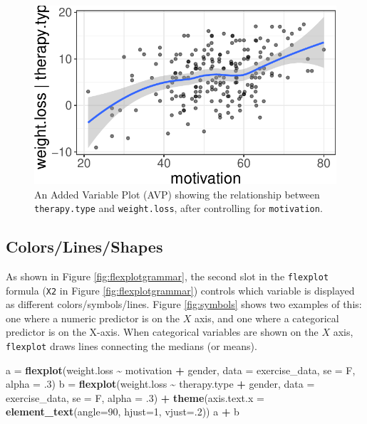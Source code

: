 \documentclass[
  man]{apa6}
\newenvironment{Shaded}{\begin{snugshade}}{\end{snugshade}}
\newcommand{\DataTypeTok}[1]{\textcolor[rgb]{0.13,0.29,0.53}{#1}}
\newcommand{\DecValTok}[1]{\textcolor[rgb]{0.00,0.00,0.81}{#1}}
\newcommand{\FloatTok}[1]{\textcolor[rgb]{0.00,0.00,0.81}{#1}}
\newcommand{\KeywordTok}[1]{\textcolor[rgb]{0.13,0.29,0.53}{\textbf{#1}}}
\newcommand{\NormalTok}[1]{#1}
\newcommand{\OperatorTok}[1]{\textcolor[rgb]{0.81,0.36,0.00}{\textbf{#1}}}
\newcommand{\StringTok}[1]{\textcolor[rgb]{0.31,0.60,0.02}{#1}}
\begin{document}
\begin{figure}
\centering
\includegraphics{flexplot_psychmeth_files/figure-latex/avp-3.pdf}
\caption{\label{fig:avp-3}An Added Variable Plot (AVP) showing the relationship between \texttt{therapy.type} and \texttt{weight.loss}, after controlling for \texttt{motivation}. \label{fig:avp}}
\end{figure}

\normalsize

\hypertarget{colorslinesshapes}{%
\subsection{Colors/Lines/Shapes}\label{colorslinesshapes}}

As shown in Figure \ref{fig:flexplotgrammar}, the second slot in the \texttt{flexplot} formula (\texttt{X2} in Figure \ref{fig:flexplotgrammar}) controls which variable is displayed as different colors/symbols/lines. Figure \ref{fig:symbols} shows two examples of this: one where a numeric predictor is on the \(X\) axis, and one where a categorical predictor is on the X-axis. When categorical variables are shown on the \(X\) axis, \texttt{flexplot} draws lines connecting the medians (or means).

\small

\begin{Shaded}
\begin{Highlighting}[]
\NormalTok{a =}\StringTok{ }\KeywordTok{flexplot}\NormalTok{(weight.loss }\OperatorTok{\textasciitilde{}}\StringTok{ }\NormalTok{motivation }\OperatorTok{+}\StringTok{ }\NormalTok{gender, }
    \DataTypeTok{data =}\NormalTok{ exercise\_data, }\DataTypeTok{se =}\NormalTok{ F, }\DataTypeTok{alpha =} \FloatTok{.3}\NormalTok{)}
\NormalTok{b =}\StringTok{ }\KeywordTok{flexplot}\NormalTok{(weight.loss }\OperatorTok{\textasciitilde{}}\StringTok{ }\NormalTok{therapy.type }\OperatorTok{+}\StringTok{ }\NormalTok{gender, }
    \DataTypeTok{data =}\NormalTok{ exercise\_data, }\DataTypeTok{se =}\NormalTok{ F, }\DataTypeTok{alpha =} \FloatTok{.3}\NormalTok{) }\OperatorTok{+}
\StringTok{    }\KeywordTok{theme}\NormalTok{(}\DataTypeTok{axis.text.x =} \KeywordTok{element\_text}\NormalTok{(}\DataTypeTok{angle=}\DecValTok{90}\NormalTok{, }\DataTypeTok{hjust=}\DecValTok{1}\NormalTok{, }\DataTypeTok{vjust=}\NormalTok{.}\DecValTok{2}\NormalTok{))}
\NormalTok{a }\OperatorTok{+}\StringTok{ }\NormalTok{b}
\end{Highlighting}
\end{Shaded}
\end{document}
